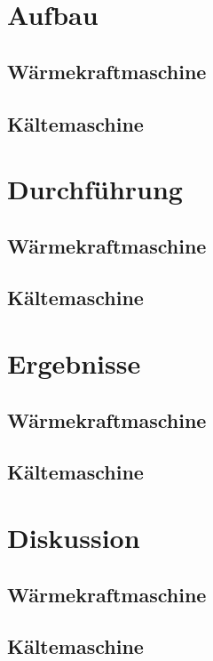 \documentclass[12pt,a4paper,twopage]{article}
\begin{document}
\section{Aufbau}
\subsection{Wärmekraftmaschine}
\subsection{Kältemaschine}

\section{Durchführung}

\subsection{Wärmekraftmaschine}
\subsection{Kältemaschine}

\section{Ergebnisse}
\subsection{Wärmekraftmaschine}
\subsection{Kältemaschine}

\section{Diskussion}
\subsection{Wärmekraftmaschine}
\subsection{Kältemaschine}
																								
\end{document}
